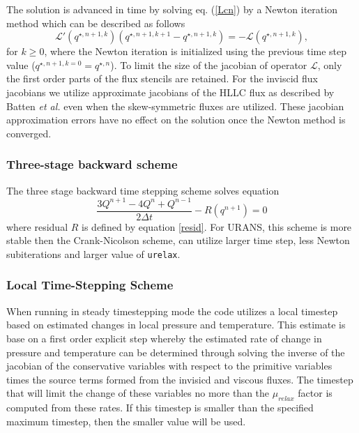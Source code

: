The solution is advanced in time by solving eq. (\ref{Lcn}) by a
Newton iteration method which can be described as follows
\begin{equation}
\mathcal{L}'(q^{\star, n+1,k}) (q^{\star,n+1,k+1} - q^{\star, n+1,k}) = -\mathcal{L}
(q^{\star,n+1,k}), \label{new}
\end{equation}
for $k\geq 0$, where the Newton iteration is initialized using the
previous time step value ($q^{\star,n+1,k=0} = q^{\star,n}$). To limit
the size of the jacobian of operator $\mathcal{L}$, only the first
order parts of the flux stencils are retained.  For the inviscid flux
jacobians we utilize approximate jacobians of the HLLC flux as
described by Batten {\it et al.} \cite{Batten.2006} even when the
skew-symmetric fluxes are utilized. These jacobian approximation
errors have no effect on the solution once the Newton method is
converged.


\subsubsection{Three-stage backward scheme}
The three stage backward time stepping scheme solves equation\cite{Pulliam}
\begin{equation}
  \frac{3Q^{n+1}-4Q^{n}+Q^{n-1}}{2\Delta t}- R(q^{n+1}) = 0
\label{Thee_stage}
\end{equation}
where residual $R$ is defined by equation \ref{resid}. For URANS, this scheme is more stable
then the Crank-Nicolson scheme, can utilize larger time step, less
Newton subiterations and larger value of {\tt urelax}.

\subsubsection{Local Time-Stepping Scheme}

When running in steady timestepping mode the code utilizes a local
timestep based on estimated changes in local pressure and temperature.
This estimate is base on a first order explicit step whereby the
estimated rate of change in pressure and temperature can be determined
through solving the inverse of the jacobian of the conservative
variables with respect to the primitive variables times the source
terms formed from the invisicd and viscous fluxes.  The timestep that
will limit the change of these variables no more than the
$\mu_{relax}$ factor is computed from these rates.  If this timestep
is smaller than the specified maximum timestep, then the smaller value
will be used.
